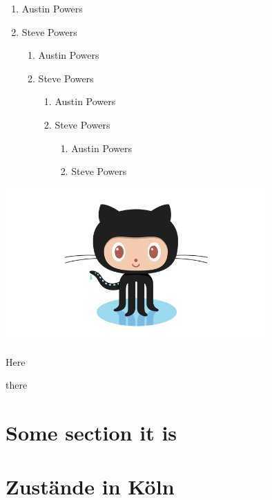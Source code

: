\documentclass[]{scrbook}
\begin{document}
\begin{enumerate}
  \item Austin Powers
  \item Steve Powers
  \begin{enumerate}
    \item Austin Powers
    \item Steve Powers
    \begin{enumerate}
      \item Austin Powers
      \item Steve Powers
      \begin{enumerate}
        \item Austin Powers
        \item Steve Powers
      \end{enumerate}
    \end{enumerate}
  \end{enumerate}
\end{enumerate}


\begin{minipage}{0.3\textwidth}
  \begin{flushright}
  \includegraphics[width=0.75\textwidth]{octocat.png}
  \end{flushright}
\end{minipage}

\begin{compactitem}
  \item Here
  \item there
\end{compactitem}

\section{Some section it is}
\Blindtext
\section{Zustände in Köln}
\end{document}
